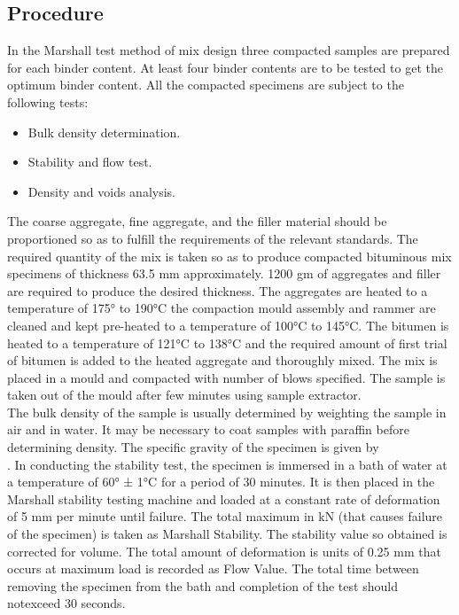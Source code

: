 \subsection{Procedure}
\vspace{.5cm}
In the Marshall test method of mix design three compacted samples are prepared for each binder content. At least four binder contents are to be tested to get the optimum binder content. All the compacted specimens are subject to the following tests:
\begin{itemize}
\item Bulk density determination.
\item Stability and flow test.
\item Density and voids analysis.
\end{itemize}
The coarse aggregate, fine aggregate, and the filler material should be proportioned so as to fulfill the requirements of the relevant standards. The required quantity of the mix is taken so as to produce compacted bituminous mix specimens of thickness 63.5 mm approximately. 1200 gm of aggregates and filler are required to produce the desired thickness. The aggregates are heated to a temperature of 175° to 190°C the compaction mould assembly and rammer are cleaned and kept pre-heated to a temperature of 100°C to 145°C. The bitumen is heated to a temperature of 121°C to 138°C and the required amount of first trial of bitumen is added to the heated aggregate and thoroughly mixed. The mix is placed in a mould and compacted with number of blows specified. The sample is taken out of the mould after few minutes using sample extractor.\\The bulk density of the sample is usually determined by weighting the sample in air and in water. It may be necessary to coat samples with paraffin before determining density. The specific gravity of the specimen is given by
\begin{equation}
\end{equation}.
In conducting the stability test, the specimen is immersed in a bath of water at a temperature of 60° ± 1°C for a period of 30 minutes. It is then placed in the Marshall stability testing machine and loaded at a constant rate of deformation of 5 mm per minute until failure. The total maximum in kN (that causes failure of the specimen) is taken as Marshall Stability. The stability value so obtained is corrected for volume. The total amount of deformation is units of 0.25 mm that occurs at maximum load is recorded as Flow Value. The total time between removing the specimen from the bath and completion of the test should notexceed 30 seconds.

